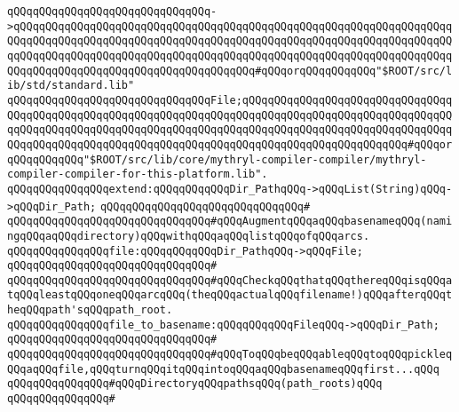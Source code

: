 \verb|qQQqqQQqqQQqqQQqqQQqqQQqqQQqqQQq->qQQqqQQqqQQqqQQqqQQqqQQqqQQqqQQqqQQqqQQqqQQqqQQqqQQqqQQqqQQqqQQqqQQqqQQqqQQqqQQqqQQqqQQqqQQqqQQqqQQqqQQqqQQqqQQqqQQqqQQqqQQqqQQqqQQqqQQqqQQqqQQqqQQqqQQqqQQqqQQqqQQqqQQqqQQqqQQqqQQqqQQqqQQqqQQqqQQqqQQqqQQqqQQqqQQqqQQqqQQqqQQqqQQqqQQqqQQqqQQqqQQqqQQq#qQQqorqQQqqQQqqQQq"$ROOT/src/lib/std/standard.lib"|\newline
\verb|qQQqqQQqqQQqqQQqqQQqqQQqqQQqqQQqFile;qQQqqQQqqQQqqQQqqQQqqQQqqQQqqQQqqQQqqQQqqQQqqQQqqQQqqQQqqQQqqQQqqQQqqQQqqQQqqQQqqQQqqQQqqQQqqQQqqQQqqQQqqQQqqQQqqQQqqQQqqQQqqQQqqQQqqQQqqQQqqQQqqQQqqQQqqQQqqQQqqQQqqQQqqQQqqQQqqQQqqQQqqQQqqQQqqQQqqQQqqQQqqQQqqQQqqQQqqQQqqQQqqQQqqQQqqQQq#qQQqorqQQqqQQqqQQq"$ROOT/src/lib/core/mythryl-compiler-compiler/mythryl-compiler-compiler-for-this-platform.lib".|\newline
\newline
\newline
\verb|qQQqqQQqqQQqqQQqextend:qQQqqQQqqQQqDir_PathqQQq->qQQqList(String)qQQq->qQQqDir_Path;|\newline
\verb|qQQqqQQqqQQqqQQqqQQqqQQqqQQqqQQq#|\newline
\verb|qQQqqQQqqQQqqQQqqQQqqQQqqQQqqQQq#qQQqAugmentqQQqaqQQqbasenameqQQq(namingqQQqaqQQqdirectory)qQQqwithqQQqaqQQqlistqQQqofqQQqarcs.|\newline
\newline
\newline
\newline
\verb|qQQqqQQqqQQqqQQqfile:qQQqqQQqqQQqDir_PathqQQq->qQQqFile;|\newline
\verb|qQQqqQQqqQQqqQQqqQQqqQQqqQQqqQQq#|\newline
\verb|qQQqqQQqqQQqqQQqqQQqqQQqqQQqqQQq#qQQqCheckqQQqthatqQQqthereqQQqisqQQqatqQQqleastqQQqoneqQQqarcqQQq(theqQQqactualqQQqfilename!)qQQqafterqQQqtheqQQqpath'sqQQqpath_root.|\newline
\newline
\verb|qQQqqQQqqQQqqQQqfile_to_basename:qQQqqQQqqQQqFileqQQq->qQQqDir_Path;|\newline
\verb|qQQqqQQqqQQqqQQqqQQqqQQqqQQqqQQq#|\newline
\verb|qQQqqQQqqQQqqQQqqQQqqQQqqQQqqQQq#qQQqToqQQqbeqQQqableqQQqtoqQQqpickleqQQqaqQQqfile,qQQqturnqQQqitqQQqintoqQQqaqQQqbasenameqQQqfirst...qQQq|\newline
\newline
\newline
\verb|qQQqqQQqqQQqqQQq#qQQqDirectoryqQQqpathsqQQq(path_roots)qQQq|\newline
\verb|qQQqqQQqqQQqqQQq#|\newline
